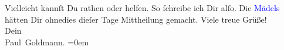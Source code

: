                Vielleicht kannſt Du rathen oder helfen. So ſchreibe ich Dir alſo. Die \textcolor{blue}{Mädels}{}\ledrightnote{{$\rightarrow$}\textcolor{blue}{Marie Glümer}{\newline}{$\rightarrow$}\textcolor{blue}{Auguste Chlum}} hätten Dir
               ohnedies dieſer Tage Mittheilung gemacht.\pend
           \pstart
           Viele treue Grüße! {\\[\baselineskip]}Dein {\\[\baselineskip]}\spacefill\mbox{Paul Goldmann.}\pend
           \leftskip=0em{}\endnumbering{}\begin{anhang}\end{anhang}
      